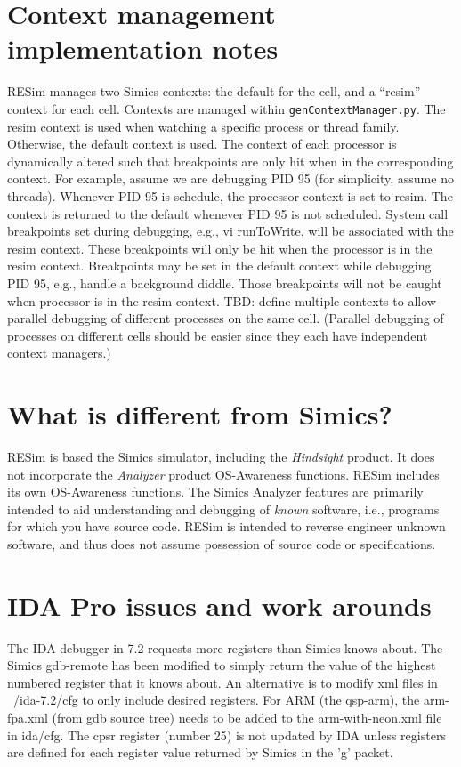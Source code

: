 \documentclass[titlepage]{article}
\begin{document}
\section{Context management implementation notes}
RESim manages two Simics contexts: the default for the cell, and a ``resim'' context for each cell.
Contexts are managed within {\tt genContextManager.py}. The resim context is used when watching a specific process
or thread family.  Otherwise, the default context is used.  The context of each processor is dynamically altered 
such that breakpoints are only hit when in the corresponding context.  For example, assume we are debugging PID 95
(for simplicity, assume no threads).
Whenever PID 95 is schedule, the processor context is set to resim.  The context is returned to the default whenever
PID 95 is not scheduled.  System call breakpoints set during debugging, e.g., vi runToWrite, will be associated
with the resim context.  These breakpoints will only be hit when the processor is in the resim context. 
Breakpoints may be set in the default context while debugging PID 95, e.g., handle a background diddle.  Those
breakpoints will not be caught when processor is in the resim context.
TBD: define multiple contexts to allow parallel debugging of different processes on the same cell.  (Parallel 
debugging of processes on different cells should be easier since they each have independent context managers.)


\section{What is different from Simics?}
RESim is based the Simics simulator, including the \textit{Hindsight} product.  It does not incorporate the \textit{Analyzer} product
OS-Awareness functions.  RESim includes its own OS-Awareness functions.  The Simics Analyzer features are primarily intended to aid
understanding and debugging of \textit{known} software, i.e., programs for which you have source code.  RESim is intended to reverse
engineer unknown software, and thus does not assume possession of source code or specifications.

\section{IDA Pro issues and work arounds}
The IDA debugger in 7.2 requests more registers than Simics knows about.  The Simics gdb-remote has been modified
to simply return the value of the highest numbered register that it knows about.  An alternative is to modify
xml files in ~/ida-7.2/cfg to only include desired registers.   For ARM (the qsp-arm), the arm-fpa.xml (from gdb source
tree) needs to be added to the arm-with-neon.xml file in ida/cfg.  The cpsr register (number 25) is not updated by IDA
unless registers are defined for each register value returned by Simics in the 'g' packet.
\end{document}
